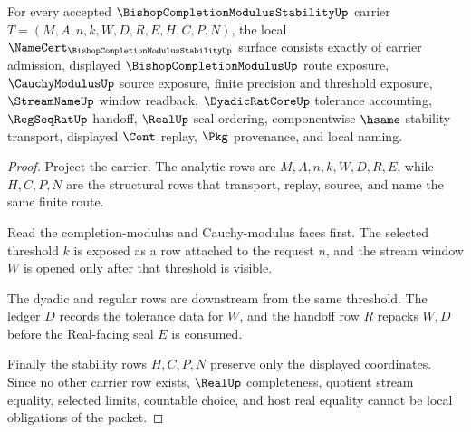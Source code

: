 \begin{theorem}
\label{thm:bishop-completion-modulus-stability-namecert-obligations}
For every accepted $\BishopCompletionModulusStabilityUp$ carrier $T=(M,A,n,k,W,D,R,E,H,C,P,N)$, the local $\NameCert_{\BishopCompletionModulusStabilityUp}$ surface consists exactly of carrier admission, displayed $\BishopCompletionModulusUp$ route exposure, $\CauchyModulusUp$ source exposure, finite precision and threshold exposure, $\StreamNameUp$ window readback, $\DyadicRatCoreUp$ tolerance accounting, $\RegSeqRatUp$ handoff, $\RealUp$ seal ordering, componentwise $\hsame$ stability transport, displayed $\Cont$ replay, $\Pkg$ provenance, and local naming.
\end{theorem}
\begin{proof}
Project the carrier. The analytic rows are $M,A,n,k,W,D,R,E$, while $H,C,P,N$ are the structural rows that transport, replay, source, and name the same finite route.

Read the completion-modulus and Cauchy-modulus faces first. The selected threshold $k$ is exposed as a row attached to the request $n$, and the stream window $W$ is opened only after that threshold is visible.

The dyadic and regular rows are downstream from the same threshold. The ledger $D$ records the tolerance data for $W$, and the handoff row $R$ repacks $W,D$ before the Real-facing seal $E$ is consumed.

Finally the stability rows $H,C,P,N$ preserve only the displayed coordinates. Since no other carrier row exists, $\RealUp$ completeness, quotient stream equality, selected limits, countable choice, and host real equality cannot be local obligations of the packet.
\end{proof}

